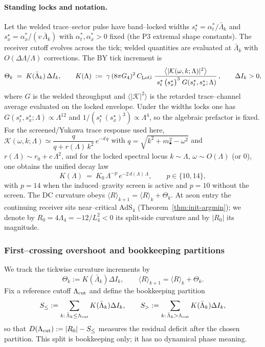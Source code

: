 \documentclass[10pt]{article}
\theoremstyle{definition}
\theoremstyle{plain}
\begin{document}
\paragraph{Standing locks and notation.}\label{par:uom-main-149}
Let the welded trace–sector pulse have band–locked widths
$s_t^\star=\alpha_t^{*}/\bar\Lambda_k$ and $s_x^\star=\alpha_x^{*}/(v\,\bar\Lambda_k)$ with
$\alpha_t^{*},\alpha_x^{*}>0$ fixed (the P3 extremal shape constants). The receiver cutoff
evolves across the tick; welded quantities are evaluated at $\bar\Lambda_k$ with
$O(\Delta\Lambda/\Lambda)$ corrections. The BY tick increment is
\begin{equation}
\label{eq:BY-step-deriv-fixed}
\Theta_k\;=\;K(\bar\Lambda_k)\,\Delta I_k,\qquad
K(\Lambda)\;:=\;\gamma\,(8\pi G_4)^2\,C_{\rm LoG}\;
\frac{\big\langle|\mathcal K(\omega,k;\Lambda)|^2\big\rangle}{\;s_t^\star\,\big(s_x^\star\big)^3\;G(s_t^\star,s_x^\star;\Lambda)}\,,
\qquad \Delta I_k>0,
\end{equation}
where $G$ is the welded throughput and $\langle|\mathcal K|^2\rangle$ is the retarded
trace–channel average evaluated on the locked envelope. Under the widths locks one has
$G(s_t^\star,s_x^\star;\Lambda)\propto \Lambda^{12}$ and $1/(s_t^\star\,(s_x^\star)^3)\propto \Lambda^{4}$, so the
algebraic prefactor is fixed. For the screened/Yukawa trace response used here,
$\mathcal K(\omega,k;\Lambda)\simeq \dfrac{q}{q+r(\Lambda)\,k^2}\,e^{-d\,q}$ with $q=\sqrt{k^2+m_\bullet^2-\omega^2}$
and $r(\Lambda)\sim r_0+c\,\Lambda^2$, and for the locked spectral locus $k\sim \Lambda$, $\omega\sim O(\Lambda)$ (or $0$),
one obtains the unified decay law
\begin{equation}
\label{eq:K-final-scaling}
K(\Lambda)\ =\ K_0\,\Lambda^{-p}\,e^{-2\,d(\Lambda)\,\Lambda},
\qquad p\in\{10,14\},
\end{equation}
with $p=14$ when the induced–gravity screen is active and $p=10$ without the screen.
The DC curvature obeys $\langle R\rangle_{k+1}=\langle R\rangle_k+\Theta_k$.
At aeon entry the continuing receiver sits near--critical AdS$_4$ (Theorem~\ref{thm:init-argmin}); we denote by
$R_0=4\Lambda_4=-12/L_4^2<0$ its split-side curvature and by $|R_0|$ its magnitude.

\subsubsection*{First--crossing overshoot and bookkeeping partitions}
\label{subsubsec:tail-first-crossing}
We track the tickwise curvature increments by
\[
\Theta_k:=K(\bar\Lambda_k)\Delta I_k,\qquad \langle R\rangle_{k+1}=\langle R\rangle_k+\Theta_k.
\]
Fix a reference cutoff $\Lambda_{\rm cut}$ and define the bookkeeping partition
\[
S_{\le}:=\sum_{k:\,\bar\Lambda_k\le\Lambda_{\rm cut}}K(\bar\Lambda_k)\Delta I_k,\qquad
S_{>}:=\sum_{k:\,\bar\Lambda_k>\Lambda_{\rm cut}}K(\bar\Lambda_k)\Delta I_k,
\]
so that $D(\Lambda_{\rm cut}):=|R_0|-S_{\le}$ measures the residual deficit after the chosen partition.
This split is bookkeeping only; it has no dynamical phase meaning.
\end{document}
